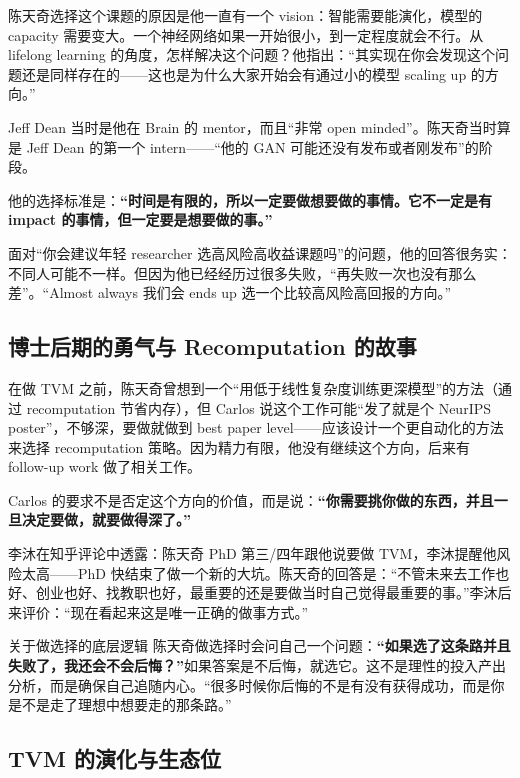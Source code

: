 陈天奇选择这个课题的原因是他一直有一个 vision：智能需要能演化，模型的 capacity 需要变大。一个神经网络如果一开始很小，到一定程度就会不行。从 lifelong learning 的角度，怎样解决这个问题？他指出：``其实现在你会发现这个问题还是同样存在的------这也是为什么大家开始会有通过小的模型 scaling up 的方向。''

Jeff Dean 当时是他在 Brain 的 mentor，而且``非常 open minded''。陈天奇当时算是 Jeff Dean 的第一个 intern------``他的 GAN 可能还没有发布或者刚发布''的阶段。

他的选择标准是：\textbf{``时间是有限的，所以一定要做想要做的事情。它不一定是有 impact 的事情，但一定要是想要做的事。''}

面对``你会建议年轻 researcher 选高风险高收益课题吗''的问题，他的回答很务实：不同人可能不一样。但因为他已经经历过很多失败，``再失败一次也没有那么差''。``Almost always 我们会 ends up 选一个比较高风险高回报的方向。''

\subsection{博士后期的勇气与 Recomputation 的故事}

在做 TVM 之前，陈天奇曾想到一个``用低于线性复杂度训练更深模型''的方法（通过 recomputation 节省内存），但 Carlos 说这个工作可能``发了就是个 NeurIPS poster''，不够深，要做就做到 best paper level------应该设计一个更自动化的方法来选择 recomputation 策略。因为精力有限，他没有继续这个方向，后来有 follow-up work 做了相关工作。

Carlos 的要求不是否定这个方向的价值，而是说：\textbf{``你需要挑你做的东西，并且一旦决定要做，就要做得深了。''}

李沐在知乎评论中透露：陈天奇 PhD 第三/四年跟他说要做 TVM，李沐提醒他风险太高------PhD 快结束了做一个新的大坑。陈天奇的回答是：``不管未来去工作也好、创业也好、找教职也好，最重要的还是要做当时自己觉得最重要的事。''李沐后来评价：``现在看起来这是唯一正确的做事方式。''

\begin{importantbox}{关于做选择的底层逻辑}
陈天奇做选择时会问自己一个问题：\textbf{``如果选了这条路并且失败了，我还会不会后悔？''}如果答案是不后悔，就选它。这不是理性的投入产出分析，而是确保自己追随内心。``很多时候你后悔的不是有没有获得成功，而是你是不是走了理想中想要走的那条路。''
\end{importantbox}

\subsection{TVM 的演化与生态位}

